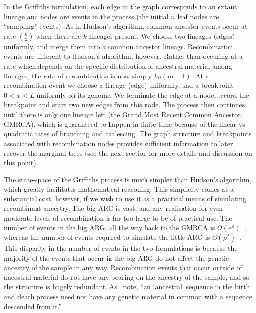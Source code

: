 \documentclass{article}
\begin{document}
In the Griffiths formulation, each edge in the graph corresponds to an extant
lineage and nodes are events in the process (the initial $n$ leaf nodes are
``sampling'' events). As in Hudson's
algorithm, common ancestor events occur at rate $\binom{k}{2}$ when there
are $k$ lineages present. We choose two lineages (edges) uniformly, and merge them
into a common ancestor lineage. Recombination events are different
to Hudson's algorithm, however. Rather than occuring at a rate which depends on
the specific distribution of ancestral material among lineages, the
rate of recombination is now simply $k \rho (m - 1)$. At a recombination event
we choose a lineage (edge) uniformly, and a
breakpoint $0 < x < L$ uniformly on its genome. We terminate the edge at a
node, record the breakpoint and start two new edges from this node. The process
then continues until there is only one lineage left (the Grand Most Recent
Common Ancestor, GMRCA), which is guaranteed to
happen in finite time because of the linear vs quadratic rates of branching
and coalescing. The graph structure and breakpoints associated with
recombination nodes provides sufficient information to later recover the marginal
trees (see the next section for more details and discussion on this point).

The state-space of the Griffiths process is much simpler than Hudson's algorithm,
which greatly facilitates mathematical reasoning. This simplicity comes at a
substantial cost, however, if we wish to use it as a practical means of
simulating recombinant ancestry. The big ARG is vast, and any realisation
for even moderate levels of recombination is far too large to be of practical
use. The number of events in the big ARG, all the way back to the GMRCA
is $O(e^\rho)$~\citep{griffiths1997ancestral}, whereas the number
of events required to simulate the little ARG is
$O(\rho^2)$~\citep{hein2004gene,baumdicker2021efficient}.
This disparity in the number of events in the two formulations is
because the majority of the events that occur in the big ARG do
not affect the genetic ancestry of the sample in any way. Recombination
events that occur outside of ancestral material do not have any bearing
on the ancestry of the sample, and so the structure is hugely redundant.
As~\cite{wiuf1999recombination} note,
``an `ancestral' sequence in the birth and death process
need not have any genetic material in common with a
sequence descended from it.''

\end{document}
